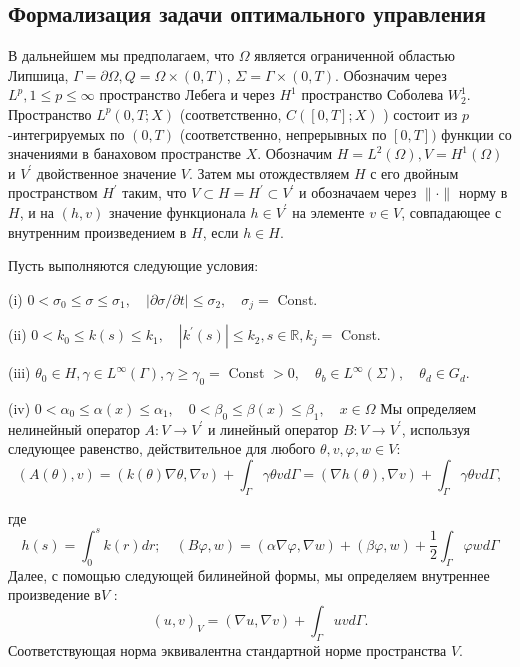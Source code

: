 \subsection{Формализация задачи оптимального управления}\label{subsec:ch3:sec3:subsec2}

В дальнейшем мы предполагаем, что $\Omega $ является ограниченной областью Липшица,
$\Gamma =\partial \Omega, Q =\Omega \times(0, T)$, $\Sigma=\Gamma \times(0, T)$.
Обозначим через $L ^ {p}, 1 \leq p \leq \infty$ пространство Лебега и через $H^{1}$
пространство Соболева $W_{2}^{1}$.
Пространство $L ^ {p}(0, T ; X)$ (соответственно, $C([0, T] ; X)$ ) состоит из
$p$-интегрируемых по $(0, T)$ (соответственно, непрерывных по $[0, T])$ функции со значениями
в банаховом пространстве $X$.
Обозначим $H=L ^{2}(\Omega), V=H^{1} (\Omega)$ и $V ^ {\prime}$ двойственное значение $V$.
Затем мы отождествляем $H $ с его двойным пространством $H ^ {\prime}$ таким,
что $V \subset H = H ^ {\prime} \subset V ^ {\prime}$ и обозначаем
через $ \|\cdot \|$ норму в $H$, и на $(h, v)$ значение функционала $h \in V ^ {\prime}$
на элементе $v  \in V$, совпадающее с внутренним произведением в $H$, если $h \in H$.


Пусть выполняются следующие условия:

(i) $0<\sigma_{0} \leq \sigma \leq \sigma_{1},
\quad|\partial \sigma / \partial t| \leq \sigma_{2}, \quad \sigma_{j}=$ Const.

(ii) $0<k_{0} \leq k(s) \leq k_{1}, \quad\left|k^{\prime}(s)\right|
\leq k_{2}, s \in \mathbb{R}, k_{j}=$ Const.

(iii) $\theta_{0} \in H, \gamma \in L^{\infty}(\Gamma),
\gamma \geq \gamma_{0}=$ Const $>0, \quad \theta_{b} \in L^{\infty}(\Sigma),
\quad \theta_{d} \in G_{d}$.

(iv) $0<\alpha_{0} \leq \alpha(x) \leq \alpha_{1}, \quad 0<\beta_{0}
\leq \beta(x) \leq \beta_{1}, \quad x \in \Omega$
Мы определяем нелинейный оператор $A:V\rightarrow V^{\prime}$
и линейный оператор $B:V\rightarrow V ^ {\prime}$,
используя следующее равенство, действительное для любого $\theta, v, \varphi, w \in V$:
\[
    (A(\theta), v)=(k(\theta) \nabla \theta, \nabla v)+\int_{\Gamma} \gamma \theta v d
    \Gamma=(\nabla h(\theta), \nabla v)+\int_{\Gamma} \gamma \theta v d \Gamma,
\]

где%
\[
    h(s)=\int_{0}^{s} k(r) d r ; \quad(B \varphi, w) =
    (\alpha \nabla \varphi, \nabla w)
    + (\beta \varphi, w)+\frac{1}{2} \int_{\Gamma} \varphi w d \Gamma
\]
Далее, с помощью следующей билинейной формы, мы определяем внутреннее произведение в$V$ :
\[
    (u, v)_{V}=(\nabla u, \nabla v)+\int_{\Gamma} u v d \Gamma.
\]
Соответствующая норма эквивалентна стандартной норме пространства $V$.

